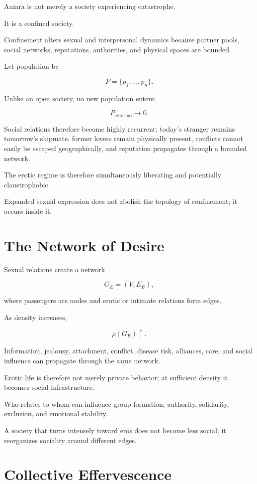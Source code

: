 \documentclass[11pt,oneside]{book}
\theoremstyle{definition}
\theoremstyle{remark}
\begin{document}
Aniara is not merely a society experiencing catastrophe.

It is a confined society.

Confinement alters sexual and interpersonal dynamics because partner pools, social networks, reputations, authorities, and physical spaces are bounded.

Let population be

\[
P=\{p_1,\ldots,p_n\}.
\]

Unlike an open society, no new population enters:

\[
P_{\mathrm{external}}\rightarrow0.
\]

Social relations therefore become highly recurrent: today's stranger remains tomorrow's shipmate, former lovers remain physically present, conflicts cannot easily be escaped geographically, and reputation propagates through a bounded network.

The erotic regime is therefore simultaneously liberating and potentially claustrophobic.

Expanded sexual expression does not abolish the topology of confinement; it occurs inside it.

\section{The Network of Desire}

Sexual relations create a network

\[
G_E=(V,E_E),
\]

where passengers are nodes and erotic or intimate relations form edges.

As density increases,

\[
\rho(G_E)\uparrow.
\]

Information, jealousy, attachment, conflict, disease risk, alliances, care, and social influence can propagate through the same network.

Erotic life is therefore not merely private behavior; at sufficient density it becomes social infrastructure.

Who relates to whom can influence group formation, authority, solidarity, exclusion, and emotional stability.

A society that turns intensely toward eros does not become less social; it reorganizes sociality around different edges.

\section{Collective Effervescence}
\end{document}
